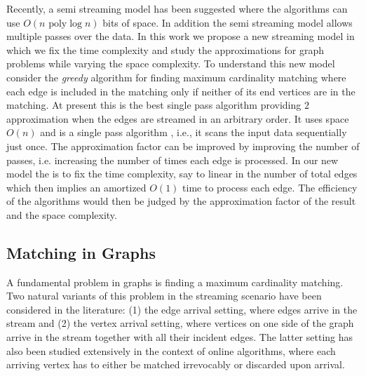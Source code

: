 \documentclass{scrartcl}
\begin{document}
Recently, a semi streaming model has been suggested where the algorithms can use $O(n \text{ poly} \log n)$ bits of space. In addition the semi streaming model allows multiple passes over the data.  In this work we propose a new streaming model in which we fix the time complexity and study the approximations for graph problems while varying the space complexity. To understand this new model consider the \emph{greedy} algorithm for finding maximum cardinality matching where each edge is included in the matching only if neither of its end vertices are in the matching. At present this is the best single pass algorithm providing $2$ approximation when the edges are streamed in an arbitrary order. It uses space $O(n)$ and is a single pass algorithm , i.e., it scans the input data sequentially just once. The approximation factor can be improved by improving the number of passes, i.e. increasing the number of times each edge is processed. In our new model the is to fix the time complexity, say to linear in the number of total edges which then implies an amortized $O(1)$ time to process each edge. The efficiency of the algorithms would then be judged by the approximation factor of the result and the space complexity.  


%
%
%
\subsection{Matching in Graphs}
A fundamental problem in graphs is finding a maximum cardinality matching. 
Two natural variants of this problem in the streaming scenario have been considered in the literature: (1) the edge
arrival setting, where edges arrive in the stream and (2) the vertex arrival setting, where vertices on one
side of the graph arrive in the stream together with all their incident edges.
The latter setting has also
been studied extensively in the context of online algorithms, where each arriving vertex has to either be
matched irrevocably or discarded upon arrival.
\end{document}
